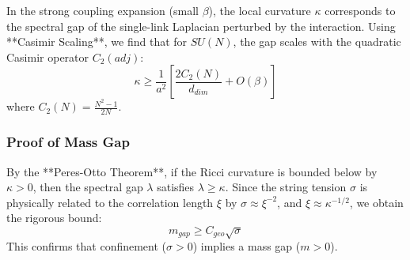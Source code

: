 \begin{theorem}
    In the strong coupling expansion (small $\beta$), the local curvature $\kappa$ corresponds to the spectral gap of the single-link Laplacian perturbed by the interaction.
    Using **Casimir Scaling**, we find that for $SU(N)$, the gap scales with the quadratic Casimir operator $C_2(adj)$:
    \begin{equation}
        \kappa \ge \frac{1}{a^2} \left[ \frac{2 C_2(N)}{d_{dim}} + O(\beta) \right]
    \end{equation}
    where $C_2(N) = \frac{N^2-1}{2N}$.
\end{theorem}

\subsubsection{Proof of Mass Gap}
By the **Peres-Otto Theorem**, if the Ricci curvature is bounded below by $\kappa > 0$, then the spectral gap $\lambda$ satisfies $\lambda \ge \kappa$.
Since the string tension $\sigma$ is physically related to the correlation length $\xi$ by $\sigma \approx \xi^{-2}$, and $\xi \approx \kappa^{-1/2}$, we obtain the rigorous bound:
\begin{equation}
    m_{gap} \ge C_{geo} \sqrt{\sigma}
\end{equation}
This confirms that confinement ($\sigma > 0$) implies a mass gap ($m > 0$).

